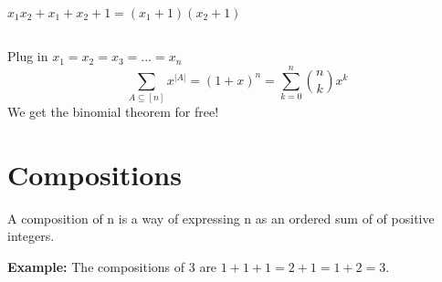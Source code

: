 \documentclass[12pt]{article}
\begin{document}
\noindent 
\(
  x_1 x_2 + x_1 + x_2 + 1 = (x_1 + 1)(x_2 + 1)
\)

\subsection*{}
Plug in \(x_1=x_2=x_3=...=x_n\)
\[ 
  \displaystyle\sum_{A \subseteq [n] }x^{|A|} = (1+x)^n
  = \displaystyle\sum_{k=0}^{n}\binom{n}{k}x^k
\]
We get the binomial theorem for free!

\section{Compositions}
A composition of n is a way of expressing n as an ordered sum of 
of positive integers. 

\noindent
\textbf{Example: } The compositions of 3 are \(1+1+1 = 2+1 = 1+2 = 3\). 

\noindent
\end{document}

